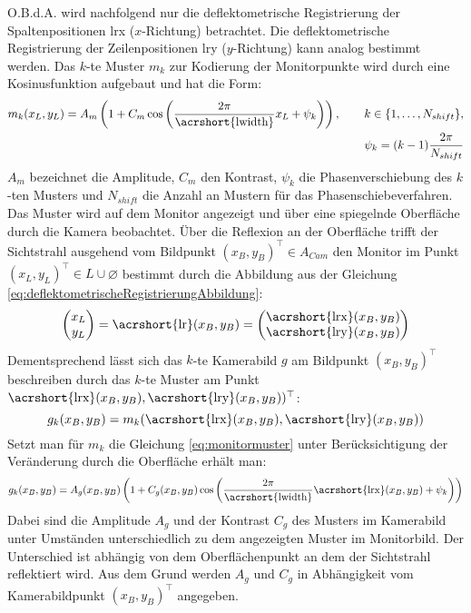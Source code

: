 \p
O.B.d.A. wird nachfolgend nur die deflektometrische Registrierung der Spaltenpositionen \acrshort{lrx} ($x$-Richtung) betrachtet.
Die deflektometrische Registrierung der Zeilenpositionen \acrshort{lry} ($y$-Richtung) kann analog bestimmt werden.
Das $k$-te Muster $m_k$ zur Kodierung der Monitorpunkte wird durch eine Kosinusfunktion aufgebaut und hat die Form:
%
\begin{equation}\label{eq:monitormuster}
	\begin{split}	
		m_k(x_L,y_L) = A_m \left(1 + C_m \cos \left(\dfrac{2\pi}{\text{\acrshort{lwidth}}} x_L + \psi_k\right)\right),
		\qquad
		k \in \lbrace 1,\ldots,N_{shift}\rbrace, \\
		\psi_k = (k - 1)\dfrac{2\pi}{N_{shift}}
	\end{split}
\end{equation}
%
$A_m$ bezeichnet die Amplitude, $C_m$ den Kontrast, $\psi_k$ die Phasenverschiebung des $k$-ten Musters und $N_{shift}$ die Anzahl an Mustern für das Phasenschiebeverfahren.
Das Muster wird auf dem Monitor angezeigt und über eine spiegelnde Oberfläche durch die Kamera beobachtet.
Über die Reflexion an der Oberfläche trifft der Sichtstrahl ausgehend vom Bildpunkt $(x_B, y_B)^\top \in A_{Cam}$ den Monitor im Punkt $(x_L, y_L)^\top \in L \cup \varnothing$ bestimmt durch die Abbildung aus der Gleichung \ref{eq:deflektometrischeRegistrierungAbbildung}:
%
\begin{equation}
	\begin{pmatrix}
		x_L \\ 
		y_L
	\end{pmatrix}
	= \text{\acrshort{lr}}(x_B, y_B) = 
	\begin{pmatrix}
		\text{\acrshort{lrx}}(x_B, y_B) \\ 
		\text{\acrshort{lry}}(x_B, y_B)
	\end{pmatrix} 
\end{equation}
%
Dementsprechend lässt sich das $k$-te Kamerabild $g$ am Bildpunkt $(x_B, y_B)^\top$ beschreiben durch das $k$-te Muster am Punkt $\text{\acrshort{lrx}}(x_B, y_B), \text{\acrshort{lry}}(x_B, y_B))^\top$:
%
\begin{equation}
	g_k(x_B, y_B) = m_k(\text{\acrshort{lrx}}(x_B, y_B), \text{\acrshort{lry}}(x_B, y_B))
\end{equation}
%
Setzt man für $m_k$ die Gleichung \ref{eq:monitormuster} unter Berücksichtigung der Veränderung durch die Oberfläche erhält man:
%
\begin{equation}\label{eq:kamerabild}
	g_k(x_B, y_B) = A_g(x_B, y_B) \left(1 + C_g(x_B, y_B) \cos \left(\dfrac{2\pi}{\text{\acrshort{lwidth}}}\text{\acrshort{lrx}}(x_B, y_B) + \psi_k\right)\right)
\end{equation}
%
Dabei sind die Amplitude $A_g$ und der Kontrast $C_g$ des Musters im Kamerabild unter Umständen unterschiedlich zu dem angezeigten Muster im Monitorbild.
Der Unterschied ist abhängig von dem Oberflächenpunkt an dem der Sichtstrahl reflektiert wird.
Aus dem Grund werden $A_g$ und $C_g$ in Abhängigkeit vom Kamerabildpunkt $(x_B, y_B)^\top$ angegeben.

